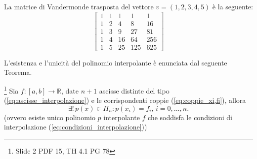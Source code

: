 \begin{example}
	La matrice di Vandermonde trasposta del vettore $v=(1, 2, 3, 4, 5)$ è la seguente:
	\begin{equation*}
		\begin{bmatrix}
			1    &  1 & 1  &   1  &   1 \\
			1    & 2   &  4  &   8   & 16 \\
			1     & 3   &  9 &   27 &   81\\
			1    & 4   & 16  &  64  &  256 \\
			1     & 5 &   25 &  125 &  625
		\end{bmatrix}
	\end{equation*}
\end{example}

L'esistenza e l'unicità del polinomio interpolante è enunciata dal seguente Teorema.
\begin{theorem}\label{th:esistenza_unicita_polinomio_interpolante}\footnote{Slide 2 PDF 15, TH 4.1 PG 78}
    Sia $f\colon [a,b]\rightarrow\mathbb{R}$, date $n+1$ ascisse distinte del tipo (\ref{eq:ascisse_interpolazione}) e le corrispondenti coppie (\ref{eq:coppie_xi,fi}), allora
    \begin{equation*}
    	\exists!\, p(x)\in\Pi_n: p(x_i)=f_i,\, i=0,\hdots,n.
    \end{equation*}
    (ovvero esiste unico polinomio $p$ interpolante $f$ che soddisfa le condizioni di interpolazione (\ref{eq:condizioni_interpolazione}))
\end{theorem}
